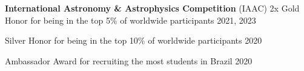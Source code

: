 \begin{entry}{{\bf International Astronomy \& Astrophysics Competition} (IAAC)}{}
	2x Gold Honor for being in the top 5\% of worldwide participants \hfill 2021, 2023

	Silver Honor for being in the top 10\% of worldwide participants \hfill 2020

	Ambassador Award for recruiting the most students in Brazil \hfill 2020

\end{entry}
